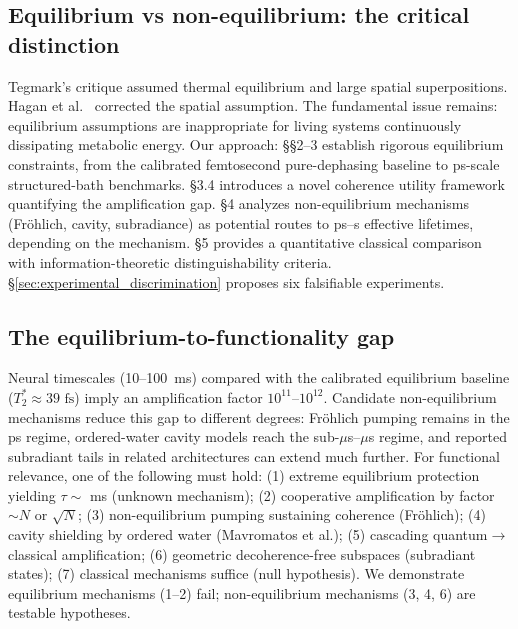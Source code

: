 \documentclass[twocolumn,10pt]{article}
\newcommand{\fs}{\text{~fs}}
\begin{document}
\subsection{Equilibrium vs non-equilibrium: the critical distinction}
Tegmark's critique \cite{Tegmark2000} assumed thermal equilibrium and large
spatial superpositions. Hagan et al.\ \cite{Hagan2002} corrected the spatial
assumption. The fundamental issue remains: equilibrium assumptions are
inappropriate for living systems continuously dissipating metabolic energy.
Our approach: \S\S 2--3 establish rigorous equilibrium constraints,
from the calibrated femtosecond pure-dephasing baseline to ps-scale
structured-bath benchmarks. \S 3.4 introduces a novel coherence utility framework
quantifying the amplification gap. \S 4 analyzes non-equilibrium mechanisms
(Fr\"ohlich, cavity, subradiance) as potential routes to ps--s effective
lifetimes, depending on the mechanism.
\S 5 provides a quantitative classical comparison with information-theoretic
distinguishability criteria. \S\ref{sec:experimental_discrimination} proposes six falsifiable experiments.
\subsection{The equilibrium-to-functionality gap}
Neural timescales (10--100~ms) compared with the calibrated equilibrium
baseline ($T_2^*\approx39\fs$) imply an amplification factor
$10^{11}\text{--}10^{12}$. Candidate non-equilibrium mechanisms reduce
this gap to different degrees: Fr\"ohlich pumping remains in the ps regime,
ordered-water cavity models reach the sub-\(\mu\)s--\(\mu\)s regime, and
reported subradiant tails in related architectures can extend much further. For functional relevance, one of the
following must hold: (1) extreme equilibrium protection yielding
$\tau \sim$ ms (unknown mechanism); (2) cooperative amplification by factor
$\sim N$ or $\sqrt{N}$; (3) non-equilibrium pumping sustaining coherence
(Fr\"ohlich); (4) cavity shielding by ordered water (Mavromatos et al.);
(5) cascading quantum$\to$classical amplification; (6) geometric
decoherence-free subspaces (subradiant states); (7) classical mechanisms
suffice (null hypothesis). We demonstrate equilibrium mechanisms (1--2)
fail; non-equilibrium mechanisms (3, 4, 6) are testable hypotheses.
\end{document}
